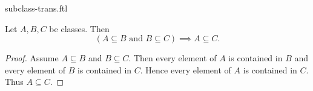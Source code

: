 \documentclass{stex}
\begin{document}
\begin{smodule}{subclass-trans.ftl}

  \begin{forthel}
  \end{forthel}

  \begin{forthel}
    \begin{proposition}
      Let $A, B, C$ be classes.
      Then \[ (\text{$A \subseteq B$ and $B \subseteq C$}) \implies A \subseteq C. \]
    \end{proposition}
    \begin{proof}
      Assume $A \subseteq B$ and $B \subseteq C$.
      Then every element of $A$ is contained in $B$ and every element of $B$ is contained in $C$.
      Hence every element of $A$ is contained in $C$.
      Thus $A \subseteq C$.
    \end{proof}
  \end{forthel}
\end{smodule}
\end{document}
